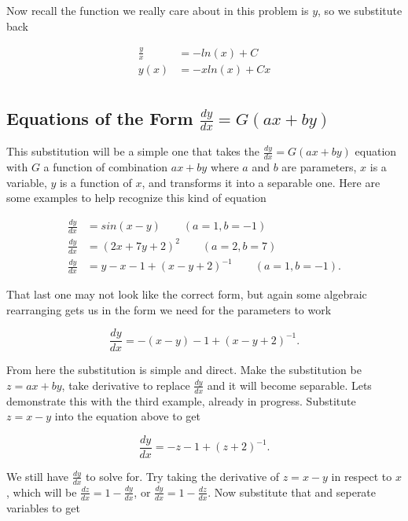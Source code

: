 \documentclass[12pt]{article}
\begin{document}
Now recall the function we really care about in this problem is $y$, so we substitute back

\begin{align*}
    \frac{y}{x} &= -ln(x) + C \\
    y(x) &= -xln(x) + Cx \\
\end{align*}





\subsection{Equations of the Form $\frac{dy}{dx} = G(ax+by)$}

This substitution will be a simple one that takes the $\frac{dy}{dx} = G(ax+by)$ equation with $G$ a function of combination $ax+by$ where $a$ and $b$ are parameters, $x$ is a variable, $y$ is a function of $x$, and transforms it into a separable one. Here are some examples to help recognize this kind of equation

\begin{align*}
    \frac{dy}{dx}&=sin(x-y) \qquad (a=1, b=-1) \\
    \frac{dy}{dx}&=(2x+7y+2)^2 \qquad (a=2, b=7) \\
    \frac{dy}{dx}&= y-x-1+(x-y+2)^{-1} \qquad (a=1, b=-1) .    
\end{align*}

That last one may not look like the correct form, but again some algebraic rearranging gets us in the form we need for the parameters to work

\begin{equation*}
    \frac{dy}{dx} = -(x-y)-1+(x-y+2)^{-1}.
\end{equation*}

From here the substitution is simple and direct. Make the substitution be $z=ax+by$, take derivative to replace $\frac{dy}{dx}$ and it will become separable. Lets demonstrate this with the third example, already in progress. Substitute $z=x-y$ into the equation above to get

\begin{equation*}
    \frac{dy}{dx} = -z-1+(z+2)^{-1}.
\end{equation*}

We still have $\frac{dy}{dx}$ to solve for. Try taking the derivative of $z=x-y$ in respect to $x$, which will be $\frac{dz}{dx} = 1-\frac{dy}{dx}$, or $\frac{dy}{dx}=1-\frac{dz}{dx}$. Now substitute that and seperate variables to get
\end{document}
